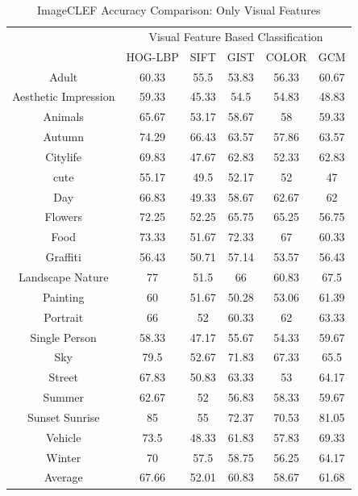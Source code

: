 \begin{table}
\centering
\caption{ ImageCLEF Accuracy Comparison: Only Visual Features} %
\vspace*{0.2 cm}
\begin{tabular}{| c | c | c | c | c | c |}
\hline
 {\multirow{2}{*}{Labels}} & \multicolumn{5}{|c|}{Visual Feature Based Classification} \\
 \cline{2-6}
 & HOG-LBP & SIFT & GIST & COLOR & GCM \\ [1ex] \hline
Adult & 60.33 & 55.5 & 53.83 & 56.33 & 60.67 \\ [1ex] \hline
Aesthetic Impression & 59.33 & 45.33 & 54.5 & 54.83 & 48.83 \\ [1ex] \hline
Animals & 65.67 & 53.17 & 58.67 & 58 & 59.33 \\ [1ex] \hline
Autumn & 74.29 & 66.43 & 63.57 & 57.86 & 63.57 \\ [1ex] \hline
Citylife & 69.83 & 47.67 & 62.83 & 52.33 & 62.83 \\ [1ex] \hline
cute & 55.17 & 49.5 & 52.17 & 52 & 47 \\ [1ex] \hline
Day & 66.83 & 49.33 & 58.67 & 62.67 & 62 \\ [1ex] \hline
Flowers & 72.25 & 52.25 & 65.75 & 65.25 & 56.75 \\ [1ex] \hline
Food & 73.33 & 51.67 & 72.33 & 67 & 60.33 \\ [1ex] \hline
Graffiti & 56.43 & 50.71 & 57.14 & 53.57 & 56.43 \\ [1ex] \hline
Landscape Nature & 77 & 51.5 & 66 & 60.83 & 67.5 \\ [1ex] \hline
Painting & 60 & 51.67 & 50.28 & 53.06 & 61.39 \\ [1ex] \hline
Portrait & 66 & 52 & 60.33 & 62 & 63.33 \\ [1ex] \hline
Single Person & 58.33 & 47.17 & 55.67 & 54.33 & 59.67 \\ [1ex] \hline
Sky & 79.5 & 52.67 & 71.83 & 67.33 & 65.5 \\ [1ex] \hline
Street & 67.83 & 50.83 & 63.33 & 53 & 64.17 \\ [1ex] \hline
Summer & 62.67 & 52 & 56.83 & 58.33 & 59.67 \\ [1ex] \hline
Sunset Sunrise & 85 & 55 & 72.37 & 70.53 & 81.05 \\ [1ex] \hline
Vehicle & 73.5 & 48.33 & 61.83 & 57.83 & 69.33 \\ [1ex] \hline
Winter & 70 & 57.5 & 58.75 & 56.25 & 64.17 \\ [1ex] \hline
Average & 67.66 & 52.01 & 60.83 & 58.67 & 61.68 \\ [1ex] \hline
\end{tabular}
\label{ImageCLEFAccuracyVisual} %
\end{table}

